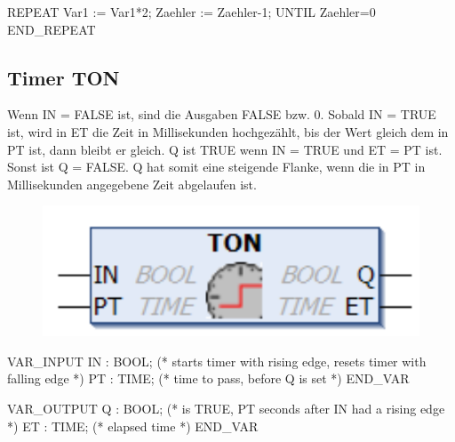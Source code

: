 \documentclass[
  10pt,
  a4paper,
]{article}
\newenvironment{Shaded}{}{}
\newcommand{\NormalTok}[1]{\textcolor[rgb]{0.14,0.16,0.18}{#1}}
\numberwithin{equation}{section}
\begin{document}
\begin{Shaded}
\begin{Highlighting}[]
\NormalTok{REPEAT}
\NormalTok{    Var1 := Var1*2;}
\NormalTok{    Zaehler := Zaehler{-}1;}
\NormalTok{UNTIL}
\NormalTok{    Zaehler=0}
\NormalTok{END\_REPEAT}
\end{Highlighting}
\end{Shaded}

\hypertarget{timer-ton}{%
\subsection{Timer TON}\label{timer-ton}}

Wenn IN = FALSE ist, sind die Ausgaben FALSE bzw. 0. Sobald IN = TRUE
ist, wird in ET die Zeit in Millisekunden hochgezählt, bis der Wert
gleich dem in PT ist, dann bleibt er gleich. Q ist TRUE wenn IN = TRUE
und ET = PT ist. Sonst ist Q = FALSE. Q hat somit eine steigende Flanke,
wenn die in PT in Millisekunden angegebene Zeit abgelaufen ist.

\begin{figure}[H]

{\centering \includegraphics{image/TON_aufbau.png}

}

\end{figure}

\begin{Shaded}
\begin{Highlighting}[]
\NormalTok{VAR\_INPUT}
\NormalTok{    IN : BOOL; (* starts timer with rising edge, resets timer with falling edge *) }
\NormalTok{    PT : TIME; (* time to pass, before Q is set *)}
\NormalTok{END\_VAR}
\end{Highlighting}
\end{Shaded}

\begin{Shaded}
\begin{Highlighting}[]
\NormalTok{VAR\_OUTPUT}
\NormalTok{    Q  : BOOL; (* is TRUE, PT seconds after IN had a rising edge *)}
\NormalTok{    ET : TIME; (* elapsed time *)}
\NormalTok{END\_VAR}
\end{Highlighting}
\end{Shaded}
\end{document}
